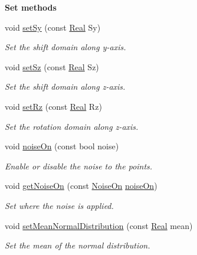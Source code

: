 \begin{Indent}{\bf Set methods}
\begin{DoxyCompactItemize}
void \hyperlink{classFVCode3D_1_1Data_a9791ad153e96354aa59eaebc7baf89b2}{set\+Sy} (const \hyperlink{namespaceFVCode3D_a40c1f5588a248569d80aa5f867080e83}{Real} Sy)
\begin{DoxyCompactList}\small\item\em Set the shift domain along y-\/axis. \end{DoxyCompactList}\item 
void \hyperlink{classFVCode3D_1_1Data_a0d11954cc9b2bf33bbc18e03b53731fe}{set\+Sz} (const \hyperlink{namespaceFVCode3D_a40c1f5588a248569d80aa5f867080e83}{Real} Sz)
\begin{DoxyCompactList}\small\item\em Set the shift domain along z-\/axis. \end{DoxyCompactList}\item 
void \hyperlink{classFVCode3D_1_1Data_a09cc3e8cd5a26b9334e47c188d037b84}{set\+Rz} (const \hyperlink{namespaceFVCode3D_a40c1f5588a248569d80aa5f867080e83}{Real} Rz)
\begin{DoxyCompactList}\small\item\em Set the rotation domain along z-\/axis. \end{DoxyCompactList}\item 
void \hyperlink{classFVCode3D_1_1Data_a1ce9836addc2cb90909a9cc2506c8a49}{noise\+On} (const bool noise)
\begin{DoxyCompactList}\small\item\em Enable or disable the noise to the points. \end{DoxyCompactList}\item 
void \hyperlink{classFVCode3D_1_1Data_abc479bbfd38ce92c3d6a1e15c5b51a5f}{get\+Noise\+On} (const \hyperlink{classFVCode3D_1_1Data_a983fdc14aa355a7c9fd614b9655a3552}{Noise\+On} \hyperlink{classFVCode3D_1_1Data_ad19041278d7cb67b1d68665a3470fded}{noise\+On})
\begin{DoxyCompactList}\small\item\em Set where the noise is applied. \end{DoxyCompactList}\item 
void \hyperlink{classFVCode3D_1_1Data_ab244bb60161eed3678d3ce7f88071cf5}{set\+Mean\+Normal\+Distribution} (const \hyperlink{namespaceFVCode3D_a40c1f5588a248569d80aa5f867080e83}{Real} mean)
\begin{DoxyCompactList}\small\item\em Set the mean of the normal distribution. \end{DoxyCompactList}\item 

\end{DoxyCompactItemize}
\end{Indent}
